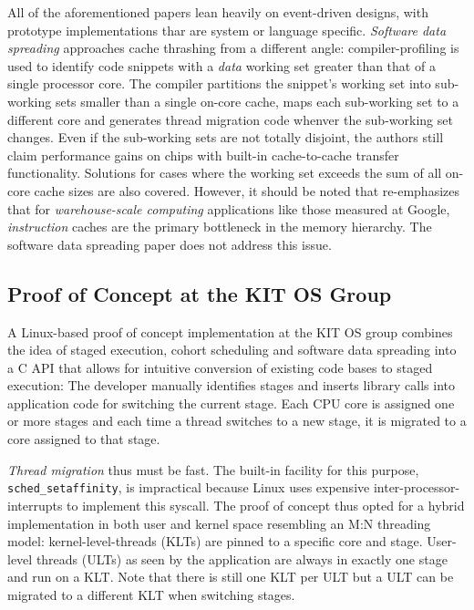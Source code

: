 \documentclass{article}
\begin{document}
All of the aforementioned papers lean heavily on event-driven designs, with prototype implementations thar are
system or language specific.
\emph{Software data spreading} \cite{sodaspr} approaches cache thrashing from a different angle: compiler-profiling is used
to identify code snippets with a \emph{data} working set greater than that of a single processor core.
The compiler partitions the snippet's working set into sub-working sets smaller than a single on-core cache, maps each
sub-working set to a different core and generates thread migration code whenver the sub-working set changes.
Even if the sub-working sets are not totally disjoint, the authors still claim performance gains
on chips with built-in cache-to-cache transfer functionality.
Solutions for cases where the working set exceeds the sum of all on-core cache sizes are also covered.
However, it should be noted that \cite{kanev2015profiling} re-emphasizes that for \textit{warehouse-scale computing} applications
like those measured at Google, \emph{instruction} caches are the primary bottleneck in the memory hierarchy.
The software data spreading paper does not address this issue.

\subsection{Proof of Concept at the KIT OS Group}\label{proofofconcept}

A Linux-based proof of concept implementation at the KIT OS group  combines the idea of staged execution, cohort
scheduling and software data spreading into a C API that allows for intuitive conversion of existing code bases to
staged execution:
The developer manually identifies stages and inserts library calls into application code for switching the current stage.
Each CPU core is assigned one or more stages and each time a thread switches to a new stage, it is migrated to a core
assigned to that stage.

\emph{Thread migration} thus must be fast.
The built-in facility for this purpose, \texttt{sched\_setaffinity}, is impractical because Linux uses
expensive inter-processor-interrupts to implement this syscall.
The proof of concept thus opted for a hybrid implementation in both user and kernel space resembling an M:N threading model:
kernel-level-threads (KLTs) are pinned to a specific core and stage.
User-level threads (ULTs) as seen by the application are always in exactly one stage and run on a KLT.
Note that there is still one KLT per ULT but a ULT can be migrated to a different KLT when switching stages.
\end{document}
